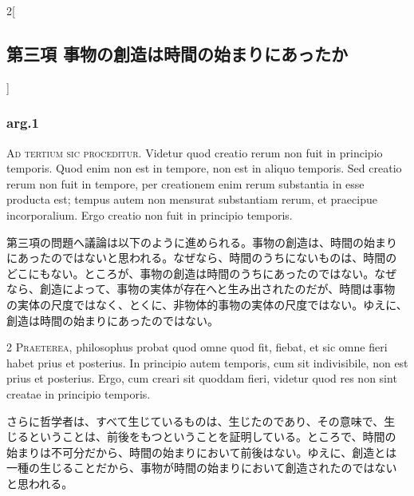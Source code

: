 \documentclass[paper=a4paper,fontsize=10pt,jafontsize=9pt,titlepage]{jlreq}
\begin{document}
\begin{paracol}{2}[\subsection{第三項 事物の創造は時間の始まりにあったか}]

\subsubsection{arg.1}

{\huge A}{\scshape d tertium sic proceditur}. Videtur quod
creatio rerum non fuit in principio temporis. Quod enim non est in
tempore, non est in aliquo temporis. Sed creatio rerum non fuit in
tempore, per creationem enim rerum substantia in esse producta est;
tempus autem non mensurat substantiam rerum, et praecipue
incorporalium. Ergo creatio non fuit in principio temporis.


\switchcolumn


第三項の問題へ議論は以下のように進められる。事物の創造は、時間の始まり
にあったのではないと思われる。なぜなら、時間のうちにないものは、時間の
どこにもない。ところが、事物の創造は時間のうちにあったのではない。なぜ
なら、創造によって、事物の実体が存在へと生み出されたのだが、時間は事物
の実体の尺度ではなく、とくに、非物体的事物の実体の尺度ではない。ゆえに、
創造は時間の始まりにあったのではない。




{\scshape 2 Praeterea}, philosophus probat quod omne
quod fit, fiebat, et sic omne fieri habet prius et posterius. In
principio autem temporis, cum sit indivisibile, non est prius et
posterius. Ergo, cum creari sit quoddam fieri, videtur quod res non sint
creatae in principio temporis.


\switchcolumn


さらに哲学者は、すべて生じているものは、生じたのであり、その意味で、生
じるということは、前後をもつということを証明している。ところで、時間の
始まりは不可分だから、時間の始まりにおいて前後はない。ゆえに、創造とは
一種の生じることだから、事物が時間の始まりにおいて創造されたのではない
と思われる。





\end{paracol}
\end{document}
